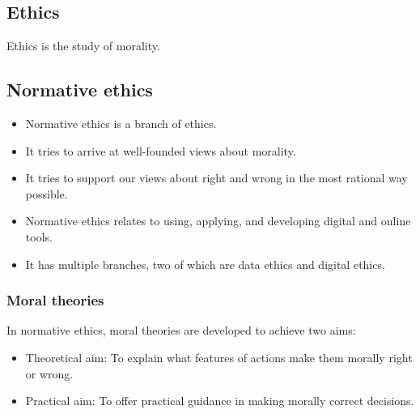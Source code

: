 \documentclass[11pt]{article}
\begin{document}
\subsection{Ethics}
\label{sec:org0f013fa}
Ethics is the study of morality.

\subsection{Normative ethics}
\label{sec:orgbbb8a79}
\begin{itemize}
\item Normative ethics is a branch of ethics.
\item It tries to arrive at well-founded views about morality.
\item It tries to support our views about right and wrong in the most rational way possible.
\item Normative ethics relates to using, applying, and developing digital and online tools.
\item It has multiple branches, two of which are data ethics and digital ethics.
\end{itemize}

\subsubsection{Moral theories}
\label{sec:org19f5d83}
In normative ethics, moral theories are developed to achieve two aims:
\begin{itemize}
\item Theoretical aim: To explain what features of actions make them morally right or wrong.
\item Practical aim: To offer practical guidance in making morally correct decisions.
\end{itemize}
\end{document}

